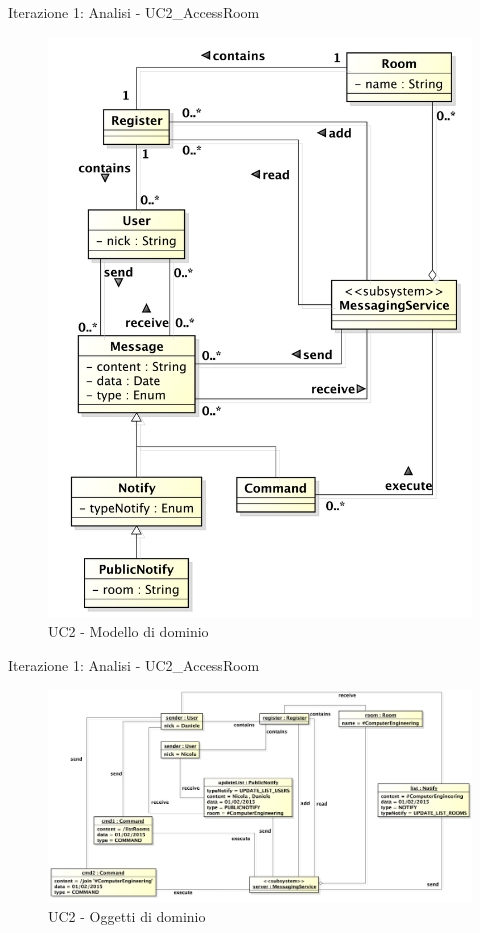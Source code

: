 \documentclass[t]{beamer} %
\begin{document}
\begin{frame} {Iterazione 1: Analisi - UC2\_AccessRoom}
   \begin{figure}
     \includegraphics[scale=0.29]{image_astah/Iteration_1_DomainModel/UC2_AccessRoom_DM.png}{\centering}
     \caption{UC2 - Modello di dominio}
     \label{fig_UC2_AR_DM} 
   \end{figure}
\end{frame}

\begin{frame} {Iterazione 1: Analisi - UC2\_AccessRoom}
   \begin{figure}
     \includegraphics[scale=0.26]{image_astah/Iteration_1_DomainModel/UC2_AccessRoom_OM}{\centering}
     \caption{UC2 - Oggetti di dominio}
     \label{fig_UC2_AR_OM} 
   \end{figure}
\end{frame}
\end{document}
